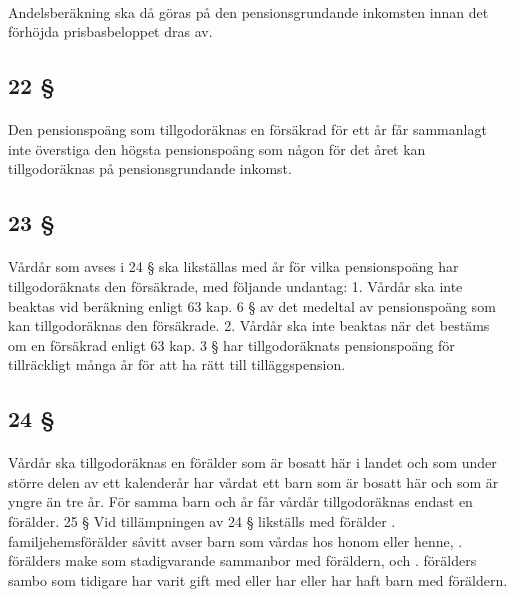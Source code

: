\documentclass[a4paper,notitlepage,openany,10pt]{book}
\begin{document}
\paragraph*{}
Andelsberäkning ska då göras på den pensionsgrundande inkomsten innan det förhöjda prisbasbeloppet dras av.
\subsection*{22 §}
\paragraph*{}
Den pensionspoäng som tillgodoräknas en försäkrad för ett år får sammanlagt inte överstiga den högsta pensionspoäng som någon för det året kan tillgodoräknas på pensionsgrundande inkomst.
\subsection*{23 §}
\paragraph*{}
Vårdår som avses i 24 § ska likställas med år för vilka pensionspoäng har tillgodoräknats den försäkrade, med följande undantag: 1. Vårdår ska inte beaktas vid beräkning enligt 63 kap. 6 § av det medeltal av pensionspoäng som kan tillgodoräknas den försäkrade. 2. Vårdår ska inte beaktas när det bestäms om en försäkrad enligt 63 kap. 3 § har tillgodoräknats pensionspoäng för tillräckligt många år för att ha rätt till tilläggspension.
\subsection*{24 §}
\paragraph*{}
Vårdår ska tillgodoräknas en förälder som är bosatt här i landet och som under större delen av ett kalenderår har vårdat ett barn som är bosatt här och som är yngre än tre år.
För samma barn och år får vårdår tillgodoräknas endast en förälder. 25 § Vid tillämpningen av 24 § likställs med förälder
. familjehemsförälder såvitt avser barn som vårdas hos honom eller henne,
. förälders make som stadigvarande sammanbor med föräldern, och
. förälders sambo som tidigare har varit gift med eller har eller har haft barn med föräldern.
\end{document}

